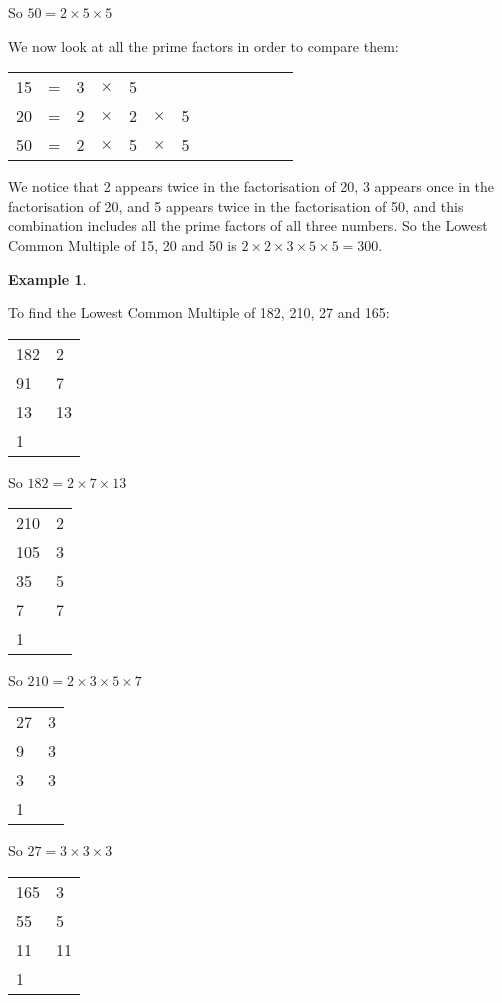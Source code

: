 \documentclass[11pt, oneside]{article}
\theoremstyle{definition}
\newtheorem{exmp}{Example}[section]
\begin{document}
So $50 = 2\times 5 \times 5$

We now look at all the prime factors in order to compare them:

\begin{tabular}{c c c c c c c c c c c c c}
15 & = & 3 & $\times$ & 5 &  &  &  &  &  &  &  &  \\
20 & = & 2 & $\times$ & 2 & $\times$ & 5 &  &  &  &  &  & \\
50 & = & 2 & $\times$ & 5 & $\times$ & 5 &  &  &  &  &  & 
\end{tabular}

We notice that 2 appears twice in the factorisation of 20, 3 appears once in the factorisation of 20, and 5 appears twice in the factorisation of 50, and this combination includes all the prime factors of all three numbers. So the Lowest Common Multiple of 15, 20 and 50 is $2\times 2 \times 3 \times 5 \times 5 = 300$. 

\begin{exmp} \end{exmp}
To find the Lowest Common Multiple of 182, 210, 27 and 165:

\begin{tabular}{ p{0.5cm} | p{1.5cm}}
182 & 2  \\
91 & 7  \\
13 & 13 \\
1 
\end{tabular}

So $182 = 2 \times 7 \times 13$

\bigbreak

\begin{tabular}{ p{0.5cm} | p{1.5cm}}
210 & 2  \\
105 & 3  \\
35 & 5  \\
7 & 7 \\
1
\end{tabular}

So $210 = 2\times 3 \times 5 \times 7$

\bigbreak

\begin{tabular}{ p{0.5cm} | p{1.5cm}}
27 & 3  \\
9 & 3  \\
3 & 3  \\
1 
\end{tabular}

So $27 = 3\times 3 \times 3$

\bigbreak

\begin{tabular}{ p{0.5cm} | p{1.5cm}}
165 & 3  \\
55 & 5  \\
11 & 11 \\
1 
\end{tabular}
\end{document}
